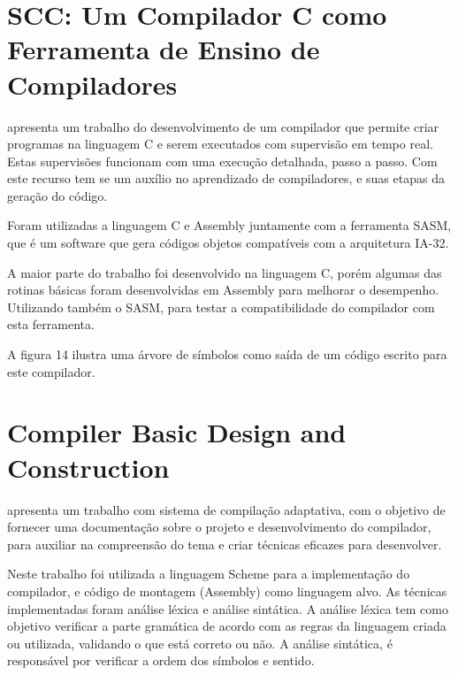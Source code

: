 \documentclass[12pt,oneside,a4paper,chapter=TITLE,section=TITLE,sumario=tradicional]{abntex2}
\begin{document}
\section{SCC: Um Compilador C como Ferramenta de Ensino de Compiladores}
\label{sec:scc}
 
\cite{juliano2009} apresenta um trabalho do desenvolvimento de um compilador que permite criar programas na linguagem C e serem executados com supervisão em tempo real. Estas supervisões funcionam com uma execução detalhada, passo a passo. Com este recurso tem se um auxílio no aprendizado de compiladores, e suas etapas da geração do código.

Foram utilizadas a linguagem C e Assembly juntamente com a ferramenta SASM, que é um software que gera códigos objetos compatíveis com a arquitetura IA-32.

A maior parte do trabalho foi desenvolvido na linguagem C, porém algumas das rotinas básicas foram desenvolvidas em Assembly para melhorar o desempenho. Utilizando também o SASM, para testar a compatibilidade do compilador com esta ferramenta.

A figura 14 ilustra uma árvore de símbolos como saída de um código escrito para este compilador. 

\begin{figure}[htb]
\end{figure}

\section{Compiler Basic Design and Construction}
\label{sec:compiler-basic}

\cite{mahak2009} apresenta um trabalho com sistema de compilação adaptativa, com o objetivo de fornecer uma documentação sobre o projeto e desenvolvimento do compilador, para auxiliar na compreensão do tema e criar técnicas eficazes para desenvolver.

Neste trabalho foi utilizada a linguagem Scheme para a implementação do compilador, e código de montagem (Assembly) como linguagem alvo. As técnicas implementadas foram análise léxica e análise sintática. A análise léxica tem como objetivo verificar a parte gramática de acordo com as regras da linguagem criada ou utilizada, validando o que está correto ou não. A análise sintática, é responsável por verificar a ordem dos símbolos e sentido.
\end{document}
